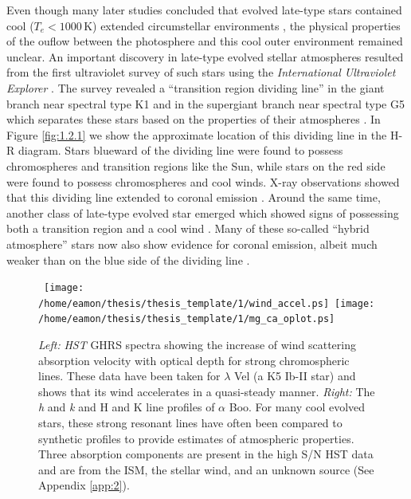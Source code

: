 Even though many later studies concluded that evolved late-type stars contained cool ($T_{e} < 1000$\,K) extended  circumstellar environments \citep[e.g.,][]{weymann_1962,gehrz_1971,bernat_1976,reimers_1975}, the physical properties of the ouflow between the photosphere and this cool outer environment remained unclear. An important discovery in late-type evolved stellar atmospheres resulted from the first ultraviolet survey of such stars using the \textit{International Ultraviolet Explorer} \citep[IUE;][]{macchetto_1978}. The survey revealed a ``transition region dividing line'' in the giant branch near spectral type K1 and in the supergiant branch near spectral type G5 which separates these stars based on the properties of their atmospheres \citep{linsky_1979, simon_1982}. In Figure \ref{fig:1.2.1} we show the approximate location of this dividing line in the H-R diagram. Stars blueward of the dividing line were found to possess chromospheres and transition regions like the Sun, while stars on the red side were found to possess chromospheres and cool winds. X-ray observations showed that this dividing line extended to coronal emission \citep{ayres_1981}. Around the same time, another class of late-type evolved star emerged which showed signs of possessing both a transition region and a cool wind \citep[e.g.,][]{reimers_1982}. Many of these so-called ``hybrid atmosphere'' stars now also show evidence for coronal emission, albeit much weaker than on the blue side of the dividing line \citep{ayres_1997,dupree_2005}. 

\begin{figure}[hb!]
\centering 
\mbox{
          \texttt{[image: /home/eamon/thesis/thesis\_template/1/wind\_accel.ps]} 
          \texttt{[image: /home/eamon/thesis/thesis\_template/1/mg\_ca\_oplot.ps]}
          }
\caption[]{\textit{Left:} \textit{HST} GHRS spectra showing the increase of wind scattering absorption velocity with optical depth for strong chromospheric lines. These data have been taken for $\lambda$ Vel (a K5 Ib-II star) and shows that its wind accelerates in a quasi-steady manner. \textit{Right:} The  \textit{h} and \textit{k} and  H and K line profiles of $\alpha$ Boo. For many cool evolved stars, these strong resonant lines have often been compared to synthetic profiles to provide estimates of atmospheric properties. Three absorption components are present in the high S/N HST data and are from the ISM, the stellar wind, and an unknown source (See Appendix \ref{app:2}).}
\label{fig:1.2.2}
\end{figure}

